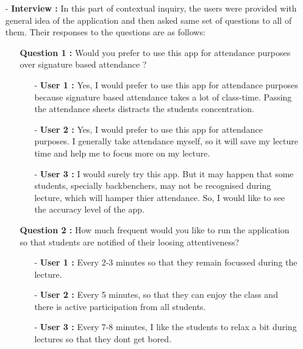 \documentclass{scrreprt}
\begin{document}
\begin{enumerate}
\item[-] \textbf{Interview :}
In this part of contextual inquiry, the users were provided with general idea of the application and then asked same set of questions to all of them. Their responses to the questions are as follows:

\begin{enumerate}
\item[] \textbf{Question 1 :} Would you prefer to use this app for attendance purposes over signature based attendance ?
\begin{enumerate}
\item[-] \textbf{User 1 :} Yes, I would prefer to use this app for attendance purposes because signature based attendance takes a lot of class-time. Passing the attendance sheets distracts the students concentration.
\item[-] \textbf{User 2 :} Yes, I would prefer to use this app for attendance purposes. I generally take attendance myself, so it will save my lecture time and help me to focus more on my lecture.
\item[-] \textbf{User 3 :} I would surely try this app. But it may happen that some students, specially backbenchers, may not be recognised during lecture, which will hamper thier attendance. So, I would like to see the accuracy level of the app. 
\end{enumerate}
\newpage
\item[] \textbf{Question 2 :} How much frequent would you like to run the application so that students are notified of their loosing attentiveness?
\begin{enumerate}
\item[-] \textbf{User 1 :} Every 2-3 minutes so that they remain focussed during the lecture.
\item[-] \textbf{User 2 :} Every 5 minutes, so that they can enjoy the class and there is active participation from all students.
\item[-] \textbf{User 3 :} Every 7-8 minutes, I like the students to relax a bit during lectures so that they dont get bored.


\end{enumerate}
\end{enumerate}
\end{enumerate}
\end{document}
